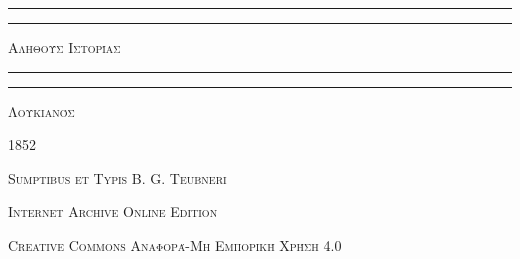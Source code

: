 \documentclass[a4paper, 11pt, oneside, polutonikogreek, german]{article}
\begin{document}
\begin{titlepage} %
	\centering %


	\rule{\textwidth}{1.6pt}\vspace*{-\baselineskip}\vspace*{2pt} %
	\rule{\textwidth}{0.4pt} %
	
	\vspace{1\baselineskip} %
	
	{\scshape\Huge Αληθούς Ιστορίας}
	
	\vspace{1\baselineskip} %

	\rule{\textwidth}{0.4pt}\vspace*{-\baselineskip}\vspace{3.2pt} %
	\rule{\textwidth}{1.6pt} %
	
	\vspace{1\baselineskip} %
	
	
	{\scshape \Large Λουκιανός}
 
        \vspace{0.5\baselineskip}
	
	\vspace*{1\baselineskip} %
	
        {\scshape \normalsize } %

        \vspace*{\fill}    

	\vspace{1\baselineskip}

	{\small\scshape 1852}
	
	{\small\scshape{Sumptibus et Typis B. G. Teubneri}}
	
	\vspace{0.5\baselineskip} %

        \scshape Internet Archive Online Edition%
    
	{\scshape\small Creative Commons Αναφορά-Μη Εμπορική Χρήση 4.0} %
\end{titlepage}
\setlength{\parskip}{1mm plus1mm minus1mm}
\clearpage
\end{document}
